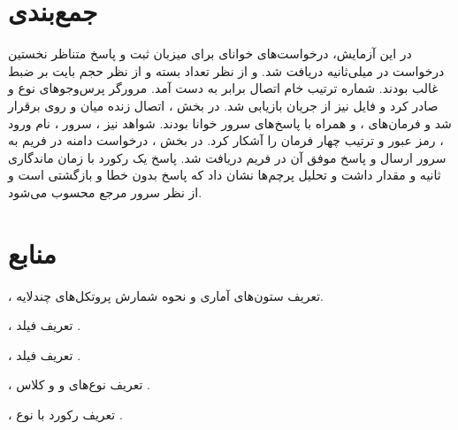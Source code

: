 \section{جمع‌بندی}

در این آزمایش، درخواست‌های خوانای  برای میزبان  ثبت و
پاسخ متناظر نخستین درخواست در  میلی‌ثانیه دریافت شد.  و  از
نظر تعداد بسته و  از نظر حجم بایت بر ضبط غالب بودند. شماره ترتیب خام اتصال
 برابر  به دست آمد. مرورگر پرس‌وجوهای  نوع  و
 صادر کرد و فایل  نیز از جریان  بازیابی شد.
در بخش ، اتصال زنده  میان  و
 روی  برقرار شد و فرمان‌های ،  و
 همراه با پاسخ‌های سرور خوانا بودند. شواهد  نیز 
، سرور ، نام ورود ، رمز عبور  و ترتیب
چهار فرمان  را آشکار کرد.
در بخش ، درخواست  دامنه  در فریم  به سرور
 ارسال و پاسخ موفق آن در فریم  دریافت شد. پاسخ یک
رکورد  با زمان ماندگاری  ثانیه و مقدار  داشت و تحلیل پرچم‌ها
نشان داد که پاسخ بدون خطا و بازگشتی است و از نظر سرور مرجع  محسوب می‌شود.

\section{منابع}


\href{https://www.wireshark.org/docs/wsug_html_chunked/ChStatHierarchy.html}{}، تعریف ستون‌های آماری و نحوه شمارش پروتکل‌های چندلایه.

\href{https://www.wireshark.org/docs/dfref/h/http.html}{}، تعریف فیلد .

\href{https://www.wireshark.org/docs/dfref/t/tcp.html}{}، تعریف فیلد .

\href{https://www.rfc-editor.org/rfc/rfc1035.html}{}، تعریف نوع‌های  و  و کلاس .

\href{https://www.rfc-editor.org/rfc/rfc9460.html}{}، تعریف رکورد  با نوع .

